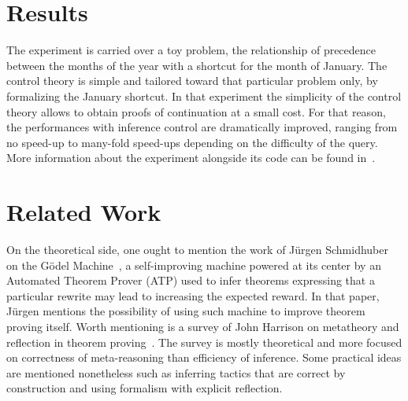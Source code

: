 \documentclass{easychair}
\begin{document}
\section{Results}

The experiment is carried over a toy problem, the relationship of
precedence between the months of the year with a shortcut for the
month of January.  The control theory is simple and tailored toward
that particular problem only, by formalizing the January shortcut.
In that experiment the simplicity of the control theory allows to
obtain proofs of continuation at a small cost.  For that reason, the
performances with inference control are dramatically improved, ranging
from no speed-up to many-fold speed-ups depending on the difficulty of
the query.  More information about the experiment alongside its code
can be found in~\cite{Geisweiller2024ICM}.






\section{Related Work}

On the theoretical side, one ought to mention the work of J\"urgen
Schmidhuber on the G\"odel Machine~\cite{Schmidhuber2003}, a
self-improving machine powered at its center by an Automated Theorem
Prover (ATP) used to infer theorems expressing that a particular
rewrite may lead to increasing the expected reward.  In that paper,
J\"urgen mentions the possibility of using such machine to improve
theorem proving itself.  Worth mentioning is a survey of John Harrison
on metatheory and reflection in theorem
proving~\cite{Harrison1995MetatheoryAR}.  The survey is mostly
theoretical and more focused on correctness of meta-reasoning than
efficiency of inference.  Some practical ideas are mentioned
nonetheless such as inferring tactics that are correct by construction
and using formalism with explicit reflection.
\end{document}
